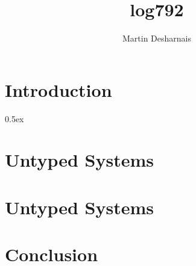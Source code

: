 \documentclass[11pt,a4paper]{report}
\begin{document}
\title{log792}
\author{Martin Desharnais}

\maketitle

\tableofcontents

\cleardoublepage{}
\pagestyle{headings}

\part{Introduction}




\parindent 0pt\parskip 0.5ex

\part{Untyped Systems}



\part{Untyped Systems}



\part{Conclusion}


%
%
\end{document}
